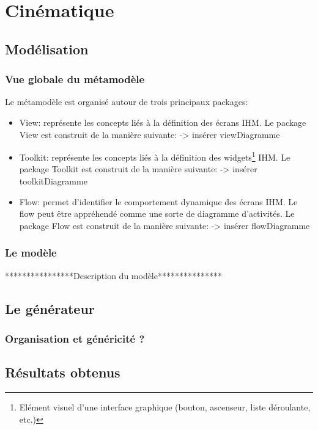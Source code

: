 \section{Cinématique}
\subsection{Modélisation}
\subsubsection{Vue globale du métamodèle}
Le métamodèle est organisé autour de trois principaux packages:
\begin{itemize}
  \item View: représente les concepts liés à la définition des écrans IHM.
Le package View est construit de la manière suivante:
\newline
-> insérer viewDiagramme
  \item Toolkit: représente les concepts liés à la définition des
  widgets\footnote{Elément visuel d'une interface graphique (bouton, ascenseur,
  liste déroulante, etc.)} IHM.
Le package Toolkit est construit de la manière suivante:
\newline
-> insérer toolkitDiagramme
  \item Flow: permet d'identifier le comportement dynamique des écrans IHM.
  Le flow peut être appréhendé comme une sorte de diagramme d'activités.
Le package Flow est construit de la manière suivante:
\newline
-> insérer flowDiagramme
\end{itemize}

\subsubsection{Le modèle}

****************Description du modèle***************

\subsection{Le générateur}
\subsubsection{Organisation et généricité ?}
\subsubsection{}
\subsection{Résultats obtenus}

